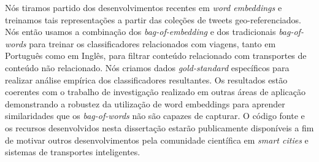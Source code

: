 Nós tiramos partido dos desenvolvimentos recentes em \textit{word embeddings} e treinamos tais representações a partir das coleções de tweets geo-referenciados. Nós então usamos a combinação dos \textit{bag-of-embedding} e dos tradicionais \textit{bag-of-words} para treinar os classificadores relacionados com viagens, tanto em Português como em Inglês, para filtrar conteúdo relacionado com transportes de conteúdo não relacionado. Nós criamos dados \textit{gold-standard} específicos para realizar análise empírica dos classificadores resultantes. Os resultados estão coerentes com o trabalho de investigação realizado em outras áreas de aplicação demonstrando a robustez da utilização de word embeddings para aprender similaridades que os \textit{bag-of-words} não são capazes de capturar. O código fonte e os recursos desenvolvidos nesta dissertação estarão publicamente disponíveis a fim de motivar outros desenvolvimentos pela comunidade científica em \textit{smart cities} e sistemas de transportes inteligentes.